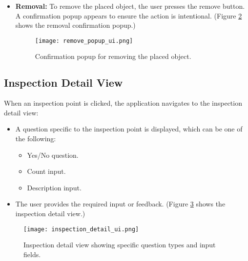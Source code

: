 \begin{itemize}
\begin{itemize}
\begin{figure}[h!]
            \label{fig:ui_inspection_view}
        \end{figure}
        \item \textbf{Removal:} To remove the placed object, the user presses the remove button. A confirmation popup appears to ensure the action is intentional. (Figure \ref{fig:ui_remove_popup} shows the removal confirmation popup.)
        \begin{figure}[h!]
            \centering
            \texttt{[image: remove\_popup\_ui.png]} %
            \caption{Confirmation popup for removing the placed object.}
            \label{fig:ui_remove_popup}
        \end{figure}
    \end{itemize}
\end{itemize}

\subsection{Inspection Detail View}
When an inspection point is clicked, the application navigates to the inspection detail view:
\begin{itemize}
    \item A question specific to the inspection point is displayed, which can be one of the following:
    \begin{itemize}
        \item Yes/No question.
        \item Count input.
        \item Description input.
    \end{itemize}
    \item The user provides the required input or feedback. (Figure \ref{fig:ui_inspection_detail} shows the inspection detail view.)
\end{itemize}

\begin{figure}[h!]
    \centering
    \texttt{[image: inspection\_detail\_ui.png]} %
    \caption{Inspection detail view showing specific question types and input fields.}
    \label{fig:ui_inspection_detail}
\end{figure}
